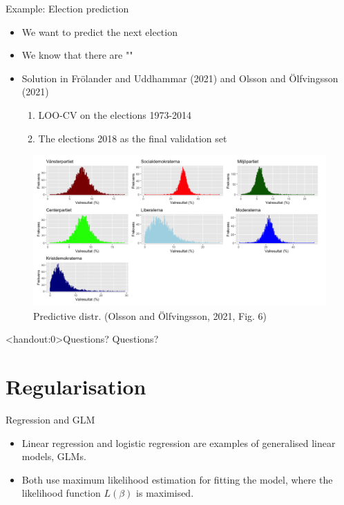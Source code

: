 \documentclass[10pt,handout]{beamer}
\begin{document}
\begin{frame}{Example: Election prediction}

\begin{itemize}
\item We want to predict the next election
\item We know that there are ""
\item Solution in Frölander and Uddhammar (2021) and Olsson and Ölfvingsson (2021)
\begin{enumerate}
\item LOO-CV on the elections 1973-2014
\item The elections 2018 as the final validation set
\end{enumerate}


\end{itemize}

\begin{figure}[h]
\caption{Predictive distr. (Olsson and Ölfvingsson, 2021, Fig. 6)}
\centering
\includegraphics[width=1\textwidth]{figs/elections}
\end{figure}

\end{frame}

\begin{frame}<handout:0>{Questions?}
Questions?
\end{frame}


\section{Regularisation}
\frame{\sectionpage}

\begin{frame}{Regression and GLM}
\begin{itemize}
\item Linear regression and logistic regression are examples of {\color{uured}generalised linear models}, GLMs.\\[3mm]\pause
\item Both use maximum likelihood estimation for fitting the model, where the likelihood function $L(\beta)$ is maximised.
\end{itemize}
\end{frame}
\end{document}
